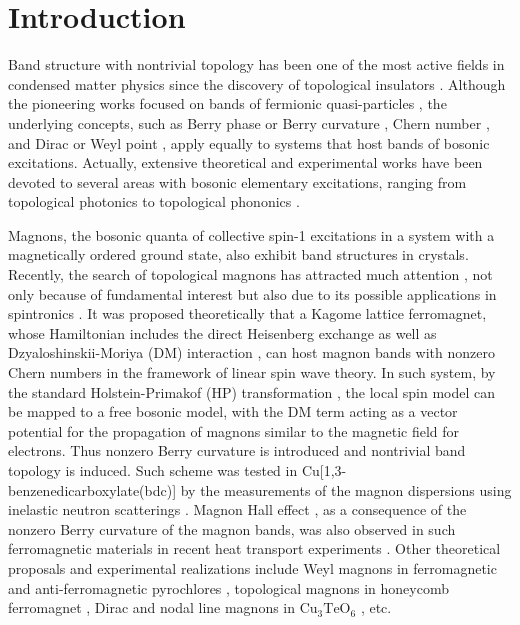 \documentclass[amsmath,superscriptaddress,showpacs,aps,prb,twocolumn]{revtex4-1}
\begin{document}
\section{Introduction}
\par Band structure with nontrivial topology \cite{BLD_RMP2016} has been one of the most active fields in condensed matter physics since the discovery of topological insulators \cite{HK_RMP2010,QZ_RMP2011}. Although the pioneering works focused on bands of fermionic quasi-particles \cite{H_PRL1988,K_PU2001,KM_PRL2005,BHZ_S2006,QHRZ_PRL2009,YXL_PRL2011}, the underlying concepts, such as Berry phase or Berry curvature \cite{B_PRSA1984}, Chern number \cite{TKNN_PRL1982,S_PRL1983}, and Dirac or Weyl point \cite{WAVS_PRB2011}, apply equally to systems that host bands of bosonic excitations. Actually, extensive theoretical and experimental works have been devoted to several areas with bosonic elementary excitations, ranging from topological photonics \cite{LJS_NP2014} to topological phononics \cite{PP_PRL2009}.

\par Magnons, the bosonic quanta of collective spin-1 excitations in a system with a magnetically ordered ground state, also exhibit band structures in crystals. Recently, the search of topological magnons has attracted much attention \cite{OIKSNT_S2010,ZRWL_PRB2013,CHFSBNL_PRL2015,LLKBYC_NC2016,MHJM_PRL_2016,O_JPCM2016,RNF_NJP2016,MS_PRB2017,SWW_PRB2017,LF_PRL2017,M_NP2017,MHM_PRB2017,LLHLF_PRL2017,YLWXDIKLFL_arXiv2017,BWWCLMWRDAWYJW_arXiv2017}, not only because of fundamental interest but also due to its possible applications in spintronics \cite{CVSH_NP2015}. It was proposed theoretically \cite{OIKSNT_S2010,ZRWL_PRB2013} that a Kagome lattice ferromagnet, whose Hamiltonian includes the direct Heisenberg exchange as well as Dzyaloshinskii-Moriya (DM) interaction \cite{D_JPCS1958,M_PR1960}, can host magnon bands with nonzero Chern numbers in the framework of linear spin wave theory. In such system, by the standard Holstein-Primakof (HP) transformation \cite{HP_PR1940}, the local spin model can be mapped to a free bosonic model, with the DM term acting as a vector potential for the propagation of magnons similar to the magnetic field for electrons. Thus nonzero Berry curvature is introduced and nontrivial band topology is induced. Such scheme was tested in Cu[1,3-benzenedicarboxylate(bdc)] by the measurements of the magnon dispersions using inelastic neutron scatterings \cite{CHFSBNL_PRL2015}. Magnon Hall effect \cite{KNL_PRL2010}, as a consequence of the nonzero Berry curvature of the magnon bands, was also observed in such ferromagnetic materials in recent heat transport experiments \cite{OIKSNT_S2010,HCLO_PRL2015}. Other theoretical proposals and experimental realizations include Weyl magnons in ferromagnetic and anti-ferromagnetic pyrochlores \cite{LLKBYC_NC2016,MHJM_PRL_2016,SWW_PRB2017}, topological magnons in honeycomb ferromagnet \cite{O_JPCM2016}, Dirac and nodal line magnons in $\text{Cu}_3\text{TeO}_6$ \cite{LLHLF_PRL2017,YLWXDIKLFL_arXiv2017,BWWCLMWRDAWYJW_arXiv2017}, etc.
\end{document}
